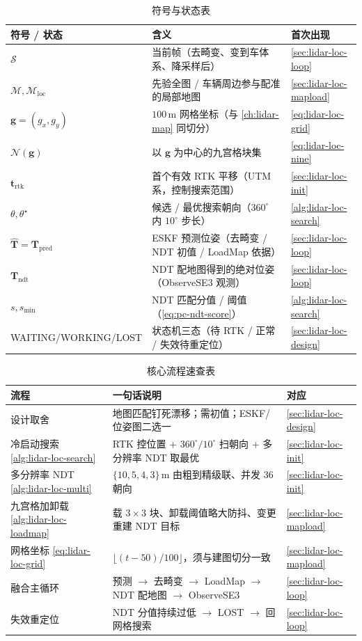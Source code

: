 \begin{table}[H]\centering\small
\caption{符号与状态表}
\begin{tabular}{lll}
\toprule
符号 / 状态 & 含义 & 首次出现 \\
\midrule
$\mathcal S$ & 当前帧（去畸变、变到车体系、降采样后） & \cref{sec:lidar-loc-loop} \\
$\mathcal M,\mathcal M_{\mathrm{loc}}$ & 先验全图 / 车辆周边参与配准的局部地图 & \cref{sec:lidar-loc-mapload} \\
$\mathbf g=(g_x,g_y)$ & $100$\,m 网格坐标（与 \cref{ch:lidar-map} 同切分） & \cref{eq:lidar-loc-grid} \\
$\mathcal N(\mathbf g)$ & 以 $\mathbf g$ 为中心的九宫格块集 & \cref{eq:lidar-loc-nine} \\
$\mathbf t_{\mathrm{rtk}}$ & 首个有效 RTK 平移（UTM 系，控制搜索范围） & \cref{sec:lidar-loc-init} \\
$\theta,\theta^\star$ & 候选 / 最优搜索朝向（$360^\circ$ 内 $10^\circ$ 步长） & \cref{alg:lidar-loc-search} \\
$\hat{\mathbf T}=\mathbf T_{\mathrm{pred}}$ & ESKF 预测位姿（去畸变 / NDT 初值 / LoadMap 依据） & \cref{sec:lidar-loc-loop} \\
$\mathbf T_{\mathrm{ndt}}$ & NDT 配地图得到的绝对位姿（ObserveSE3 观测） & \cref{sec:lidar-loc-loop} \\
$s,s_{\min}$ & NDT 匹配分值 / 阈值（\cref{eq:pc-ndt-score}） & \cref{alg:lidar-loc-search} \\
\textsf{WAITING/WORKING/LOST} & 状态机三态（待 RTK / 正常 / 失效待重定位） & \cref{sec:lidar-loc-design} \\
\bottomrule
\end{tabular}
\end{table}

\begin{table}[H]\centering\small
\caption{核心流程速查表}
\begin{tabular}{lll}
\toprule
流程 & 一句话说明 & 对应 \\
\midrule
设计取舍 & 地图匹配钉死漂移；需初值；ESKF/位姿图二选一 & \cref{sec:lidar-loc-design} \\
冷启动搜索 \cref{alg:lidar-loc-search} & RTK 控位置 + $360^\circ/10^\circ$ 扫朝向 + 多分辨率 NDT 取最优 & \cref{sec:lidar-loc-init} \\
多分辨率 NDT \cref{alg:lidar-loc-multi} & $\{10,5,4,3\}$\,m 由粗到精级联、并发 $36$ 朝向 & \cref{sec:lidar-loc-init} \\
九宫格加卸载 \cref{alg:lidar-loc-loadmap} & 载 $3\times3$ 块、卸载阈值略大防抖、变更重建 NDT 目标 & \cref{sec:lidar-loc-mapload} \\
网格坐标 \cref{eq:lidar-loc-grid} & $\lfloor(t-50)/100\rfloor$，须与建图切分一致 & \cref{sec:lidar-loc-mapload} \\
融合主循环 & 预测 $\to$ 去畸变 $\to$ LoadMap $\to$ NDT 配地图 $\to$ ObserveSE3 & \cref{sec:lidar-loc-loop} \\
失效重定位 & NDT 分值持续过低 $\to$ \textsf{LOST} $\to$ 回网格搜索 & \cref{sec:lidar-loc-loop} \\
\bottomrule
\end{tabular}
\end{table}

